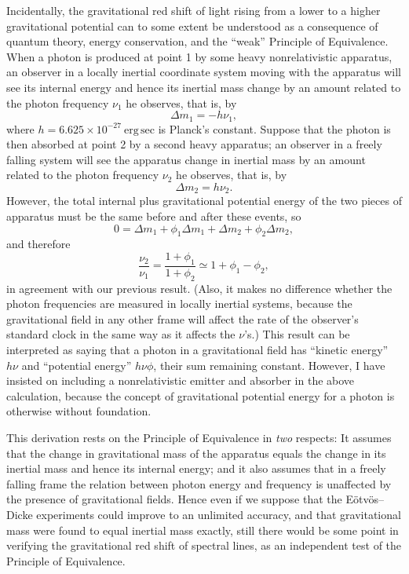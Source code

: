 Incidentally, the gravitational red shift of light rising from a lower to a
higher gravitational potential can to some extent be understood as a
consequence of quantum theory, energy conservation, and the ``weak''
Principle of Equivalence. When a photon is produced at point 1 by some heavy
nonrelativistic apparatus, an observer in a locally inertial coordinate
system moving with the apparatus will see its internal energy and hence its
inertial mass change by an amount related to the photon frequency $\nu_1$ he
observes, that is, by
\[
  \Delta m_1=-h\nu_1,
\]
where $h=6.625\times10^{-27}\ \mathrm{erg\,sec}$ is Planck's constant.
Suppose that the photon is then absorbed at point 2 by a second heavy
apparatus; an observer in a freely falling system will see the apparatus
change in inertial mass by an amount related to the photon frequency $\nu_2$
he observes, that is, by
\[
  \Delta m_2=h\nu_2.
\]
However, the total internal plus gravitational potential energy of the two
pieces of apparatus must be the same before and after these events, so
\[
  0=\Delta m_1+\phi_1\Delta m_1+\Delta m_2+\phi_2\Delta m_2,
\]
and therefore
\[
  \frac{\nu_2}{\nu_1}
  =\frac{1+\phi_1}{1+\phi_2}
  \simeq1+\phi_1-\phi_2,
\]
in agreement with our previous result. (Also, it makes no difference whether
the photon frequencies are measured in locally inertial systems, because
the gravitational field in any other frame will affect the rate of the
observer's standard clock in the same way as it affects the $\nu$'s.) This
result can be interpreted as saying that a photon in a gravitational field
has ``kinetic energy'' $h\nu$ and ``potential energy'' $h\nu\phi$, their sum
remaining constant. However, I have insisted on including a nonrelativistic
emitter and absorber in the above calculation, because the concept of
gravitational potential energy for a photon is otherwise without foundation.

This derivation rests on the Principle of Equivalence in \emph{two}
respects: It assumes that the change in gravitational mass of the apparatus
equals the change in its inertial mass and hence its internal energy; and it
also assumes that in a freely falling frame the relation between photon
energy and frequency is unaffected by the presence of gravitational fields.
Hence even if we suppose that the E\"otv\"os--Dicke experiments could improve
to an unlimited accuracy, and that gravitational mass were found to equal
inertial mass exactly, still there would be some point in verifying the
gravitational red shift of spectral lines, as an independent test of the
Principle of Equivalence.
